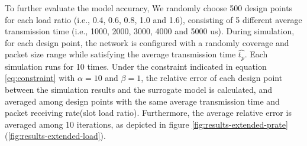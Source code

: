 

To further evaluate the model accuracy, We randomly choose 500 design points for each load ratio (i.e., 0.4, 0.6, 0.8, 1.0 and 1.6), consisting of 5 different average transmission time (i.e., 1000, 2000, 3000, 4000 and 5000 us). During simulation, for each design point, the network is configured with a randomly coverage and packet size range while satisfying the average transmission time $\hat{t_p}$. Each simulation runs for 10 times.
Under the constraint indicated in equation \ref{eq:constraint} with $\alpha=10$ and $\beta=1$, the relative error of each design point between the simulation results and the surrogate model is calculated, and averaged among design points with the same average transmission time and packet receiving rate(slot load ratio). Furthermore, the average relative error is averaged among 10 iterations, as depicted in figure \ref{fig:results-extended-prate} (\ref{fig:results-extended-load}). 

